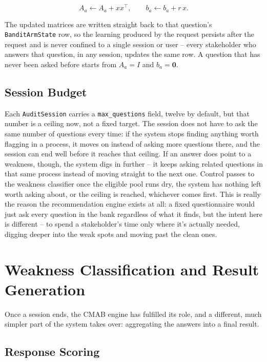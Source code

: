 \documentclass[a4paper, 12pt, oneside, openany, BCOR1cm,toc=chapterentrywithdots]{scrbook}
\begin{document}
\[
A_a \leftarrow A_a + x x^\top , \qquad b_a \leftarrow b_a + r\,x .
\]

The updated matrices are written straight back to that question's \texttt{BanditArmState} row, so
the learning produced by the request persists after the request and is never confined to a
single session or user -- every stakeholder who answers that question, in any session, updates
the same row. A question that has never been asked before starts from $A_a = I$ and
$b_a = \mathbf{0}$.

\subsection{Session Budget}

Each \texttt{AuditSession} carries a \texttt{max\_questions} field, twelve by default, but that
number is a ceiling now, not a fixed target. The session does not have to ask the same number of
questions every time: if the system stops finding anything worth flagging in a process, it moves
on instead of asking more questions there, and the session can end well before it reaches that
ceiling. If an answer does point to a weakness, though, the system digs in further -- it keeps
asking related questions in that same process instead of moving straight to the next one.
Control passes to the weakness classifier once the eligible pool runs dry, the system has nothing
left worth asking about, or the ceiling is reached, whichever comes first. This is really the
reason the recommendation engine exists at all: a fixed questionnaire would just ask every
question in the bank regardless of what it finds, but the intent here is different -- to spend a
stakeholder's time only where it's actually needed, digging deeper into the weak spots and
moving past the clean ones.
\section{Weakness Classification and Result Generation}
\label{sec:weakness-classification}

Once a session ends, the CMAB engine has fulfilled its role, and a different, much simpler part
of the system takes over: aggregating the answers into a final result.

\subsection{Response Scoring}
\end{document}
